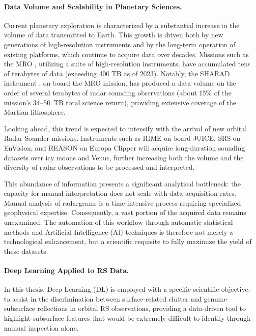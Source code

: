 \paragraph{Data Volume and Scalability in Planetary Sciences.}
\label{sec:data_challenges}
Current planetary exploration is characterized by a substantial increase in the volume of data transmitted to Earth.
This growth is driven both by new generations of high-resolution instruments and by the long-term operation of existing platforms, which continue to acquire data over decades.
Missions such as the MRO \cite{Zurek_2007}, utilizing a suite of high-resolution instruments, have accumulated tens of terabytes of data (exceeding 400 TB as of 2023).
Notably, the SHARAD instrument \cite{Seu_2007}, on board the MRO mission, has produced a data volume on the order of several terabytes of radar sounding observations (about 15\% of the mission’s 34–50~TB total science return), providing extensive coverage of the Martian lithosphere.

Looking ahead, this trend is expected to intensify with the arrival of new orbital Radar Sounder missions.
Instruments such as RIME on board JUICE, SRS on EnVision, and REASON on Europa Clipper will acquire long-duration sounding datasets over icy moons and Venus, further increasing both the volume and the diversity of radar observations to be processed and interpreted.

This abundance of information presents a significant analytical bottleneck: the capacity for manual interpretation does not scale with data acquisition rates.
Manual analysis of radargrams is a time-intensive process requiring specialized geophysical expertise.
Consequently, a vast portion of the acquired data remains unexamined.
The automation of this workflow through automatic statistical methods and Artificial Intelligence (AI) techniques is therefore not merely a technological enhancement, but a scientific requisite to fully maximize the yield of these datasets.

\paragraph{Deep Learning Applied to RS Data.}
\label{sec:intro_dl_rs}
In this thesis, Deep Learning (DL) is employed with a specific scientific objective: to assist in the discrimination between surface-related clutter and genuine subsurface reflections in orbital RS observations, providing a data-driven tool to highlight subsurface features that would be extremely difficult to identify through manual inspection alone.

